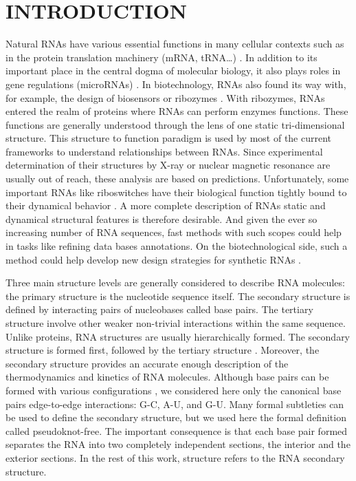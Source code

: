 \documentclass[a4paper,12pt]{article}
\begin{document}
\section*{INTRODUCTION}
\label{sec:org0105d5e}
Natural RNAs have various essential functions in many cellular contexts such as
in the protein translation machinery (mRNA, tRNA\ldots{})
\cite{ramakrishnan02_ribos_struc_mechan_trans}. In addition to its important place
in the central dogma of molecular biology, it also plays roles in gene
regulations (microRNAs) \cite{ambros04_funct_animal_micror}. In biotechnology,
RNAs also found its way with, for example, the design of biosensors or ribozymes
\cite{han10_desig_strat_aptam_based_biosen}. With ribozymes, RNAs entered the
realm of proteins where RNAs can perform enzymes functions. These functions are
generally understood through the lens of one static tri-dimensional structure.
This structure to function paradigm is used by most of the current frameworks to
understand relationships between RNAs. Since experimental determination of their
structures by X-ray or nuclear magnetic resonance are usually out of reach,
these analysis are based on predictions. Unfortunately, some important RNAs like
riboswitches have their biological function tightly bound to their dynamical
behavior \cite{vitreschak04_ribos}. A more complete description of RNAs static and
dynamical structural features is therefore desirable. And given the ever so
increasing number of RNA sequences, fast methods with such scopes could help in
tasks like refining data bases annotations. On the biotechnological side, such a
method could help develop new design strategies for synthetic RNAs
\cite{domin16_applic_comput_desig_approac_synth_ribos}.

Three main structure levels are generally considered to describe RNA molecules:
the primary structure is the nucleotide sequence itself. The secondary structure
is defined by interacting pairs of nucleobases called base pairs. The tertiary
structure involve other weaker non-trivial interactions within the same
sequence. Unlike proteins, RNA structures are usually hierarchically formed. The
secondary structure is formed first, followed by the tertiary structure
\cite{tinoco99_how_rna_folds}. Moreover, the secondary structure provides an
accurate enough description of the thermodynamics and kinetics of RNA molecules.
Although base pairs can be formed with various configurations
\cite{leontis01_geomet_nomen_class_rna_base_pairs}, we considered here only the
canonical base pairs edge-to-edge interactions: G-C, A-U, and G-U. Many formal
subtleties can be used to define the secondary structure, but we used here the
formal definition called pseudoknot-free. The important consequence is that each
base pair formed separates the RNA into two completely independent sections, the
interior and the exterior sections. In the rest of this work, structure refers
to the RNA secondary structure.
\end{document}
